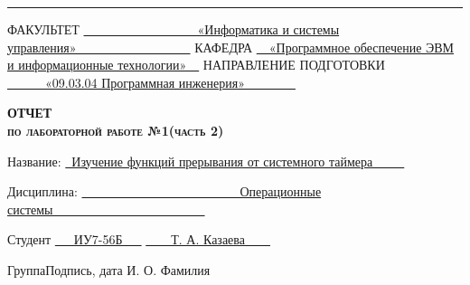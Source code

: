 \begin{titlepage}
\noindent\rule{18cm}{1.5pt}

\vspace{8mm}

\noindent\textnormal{ФАКУЛЬТЕТ}\hspace{5mm} \underline{\textnormal{~~~~~~~~~~~~~~~~~~«Информатика и системы управления»~~~~~~~~~~~~~~~~~~}} \newline\newline
\textnormal{КАФЕДРА}\hspace{5mm} \underline{\textnormal{~~«Программное обеспечение ЭВМ и информационные технологии»~~}}
\newline\newline
\textnormal{НАПРАВЛЕНИЕ ПОДГОТОВКИ}\hspace{5mm} \underline{\textnormal{~~~~~~«09.03.04 Программная инженерия»~~~~~~~~}}

\vspace{2.5cm}

\begin{center}
	\Large\textbf{\textsc{ОТЧЕТ}}\\
	\Large\textbf{\textsc{по лабораторной работе №1(часть 2)}}\\
\end{center}

\vspace{1cm}

\noindent\textnormal{Название:} \hspace{15mm} \underline{\textnormal{~Изучение функций прерывания от системного таймера~~~~~}}\noindent

\vspace{1.3cm}

\noindent\textnormal{Дисциплина:} \hspace{10mm} \underline{\textnormal{~~~~~~~~~~~~~~~~~~~~~~~~~Операционные системы~~~~~~~~~~~~~~~~~~~~~~~~}}\noindent

\vspace{2cm}

\noindent\textnormal{Студент} \hspace{17mm}
\underline{\textnormal{{~~~ИУ7-56Б~~~}}}
\hspace{20mm}
\underline{\textnormal{\hphantom{~~~~~~~~~~~~~~~~~~~~~~~~~~~}}} \hspace{15mm}
\underline{\textnormal{~~~~Т. А. Казаева~~~~}}

\vspace{2mm}
\noindent\textnormal{\hphantom{Студент}} \hspace{23mm}\noindent
\fontsize{8pt}{8pt}
\textnormal{Группа}\hspace{40mm}\textnormal{Подпись, дата} \hspace{30mm}\noindent\textnormal{И. О. Фамилия}


\end{titlepage}

